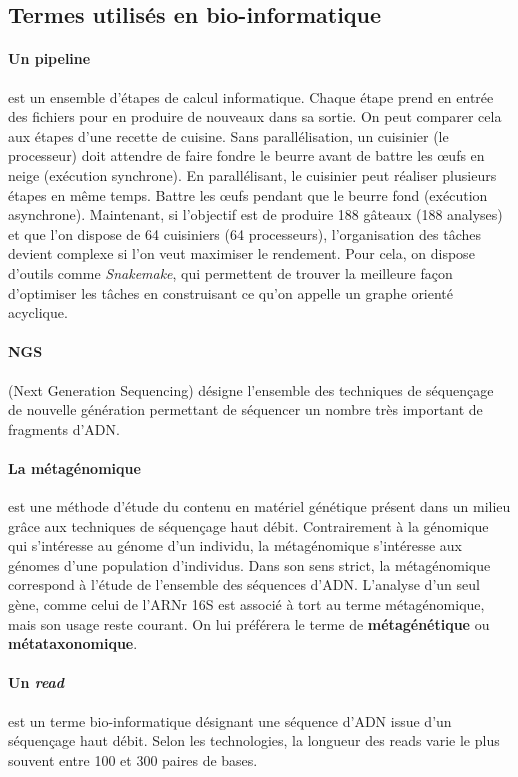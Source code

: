 \documentclass[12pt,a4paper]{article}
\begin{document}
\subsection{Termes utilisés en bio-informatique}

\paragraph{Un pipeline} est un ensemble d'étapes de calcul informatique. Chaque étape prend en entrée des fichiers pour en produire de nouveaux dans sa sortie. On peut comparer cela aux étapes d'une recette de cuisine. Sans parallélisation, un cuisinier (le processeur) doit attendre de faire fondre le beurre avant de battre les œufs en neige (exécution synchrone). En parallélisant, le cuisinier peut réaliser plusieurs étapes en même temps. Battre les œufs pendant que le beurre fond (exécution asynchrone).
Maintenant, si l'objectif est de produire 188 gâteaux (188 analyses) et que l'on dispose de 64 cuisiniers (64 processeurs), l'organisation des tâches devient complexe si l'on veut maximiser le rendement. Pour cela, on dispose d'outils comme \textit{Snakemake}\cite{Koster2012}, qui permettent de trouver la meilleure façon d'optimiser les tâches en construisant ce qu'on appelle un graphe orienté acyclique.

\paragraph{NGS}(Next Generation Sequencing) désigne l'ensemble des techniques de séquençage de nouvelle génération permettant de séquencer un nombre très important de fragments d'ADN.

\paragraph{La métagénomique} est une méthode d’étude du contenu en matériel génétique présent dans un milieu grâce aux techniques de séquençage haut débit. Contrairement à la génomique qui s’intéresse au génome d’un individu, la métagénomique s’intéresse aux génomes d’une population d’individus.
Dans son sens strict, la métagénomique correspond à l’étude de l’ensemble des séquences d'ADN. L’analyse d’un seul gène, comme celui de l’ARNr 16S est associé à tort au terme métagénomique, mais son usage reste courant. On lui préférera le terme de \textbf{métagénétique} ou \textbf{métataxonomique}.


\paragraph{Un \textit{read}} est un terme bio-informatique désignant une séquence d’ADN issue d’un séquençage haut débit. Selon les technologies, la longueur des reads varie le plus souvent entre 100 et 300 paires de bases.
\end{document}
